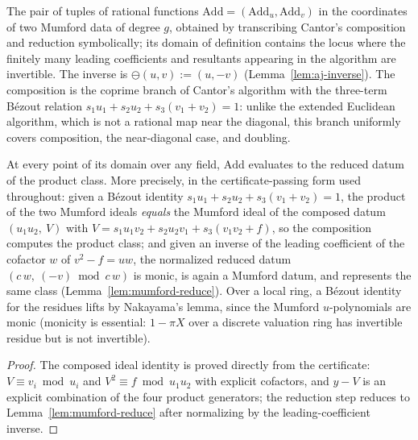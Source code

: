 \begin{definition}
\label{def:cantor-map}
\leanok
{}
The pair of tuples of rational functions
$\mathrm{Add} = (\mathrm{Add}_u, \mathrm{Add}_v)$ in the coordinates of two Mumford
data of degree $g$, obtained by transcribing Cantor's composition and reduction
symbolically; its domain of definition contains the locus where the finitely many
leading coefficients and resultants appearing in the algorithm are invertible. The
inverse is $\ominus(u, v) := (u, -v)$ (Lemma~\ref{lem:aj-inverse}). The composition is
the coprime branch of Cantor's algorithm with the three-term B\'ezout relation
$s_1 u_1 + s_2 u_2 + s_3(v_1 + v_2) = 1$: unlike the extended Euclidean algorithm,
which is not a rational map near the diagonal, this branch uniformly covers
composition, the near-diagonal case, and doubling.
\end{definition}

\begin{lemma}
\label{lem:cantor-correct}
\leanok
{}
At every point of its domain over any field, $\mathrm{Add}$ evaluates to the reduced
datum of the product class. More precisely, in the certificate-passing form used
throughout: given a B\'ezout identity $s_1 u_1 + s_2 u_2 + s_3(v_1+v_2) = 1$, the
product of the two Mumford ideals \emph{equals} the Mumford ideal of the composed datum
$(u_1 u_2,\ V)$ with $V = s_1 u_1 v_2 + s_2 u_2 v_1 + s_3(v_1 v_2 + f)$, so the
composition computes the product class; and given an inverse of the leading coefficient
of the cofactor $w$ of $v^2 - f = uw$, the normalized reduced datum
$(c\,w,\ (-v) \bmod c\,w)$ is monic, is again a Mumford datum, and represents the same
class (Lemma~\ref{lem:mumford-reduce}). Over a local ring, a B\'ezout identity for the
residues lifts by Nakayama's lemma, since the Mumford $u$-polynomials are monic
(monicity is essential: $1 - \pi X$ over a discrete valuation ring has invertible
residue but is not invertible).
\end{lemma}
\begin{proof}
\leanok
The composed ideal identity is proved directly from the certificate:
$V \equiv v_i \bmod u_i$ and $V^2 \equiv f \bmod u_1 u_2$ with explicit cofactors, and
$y - V$ is an explicit combination of the four product generators; the reduction step
reduces to Lemma~\ref{lem:mumford-reduce} after normalizing by the leading-coefficient
inverse.
\end{proof}

